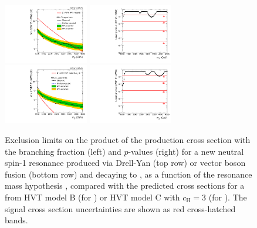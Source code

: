 \begin{figure}[htbp]
  \centering
  \includegraphics[width=0.33\textwidth]{fig/results/limits_ZprToWW.pdf}
  \includegraphics[width=0.33\textwidth]{fig/results/pvalue_ZprToWW.pdf}\\
  \includegraphics[width=0.33\textwidth]{fig/results/limits_VBFZprToWW.pdf}
  \includegraphics[width=0.33\textwidth]{fig/results/pvalue_VBFZprToWW.pdf}
  \caption{
    Exclusion limits on the product of the production cross section with the branching fraction (left) and $p$-values (right) for a new neutral spin-1 resonance produced via Drell-Yan (top row) or vector boson fusion (bottom row) and decaying to \WW, as a function of the resonance mass hypothesis \MX, compared with the predicted cross sections for a \Zpr from HVT model B (for \DY) or HVT model C with $c_\mathrm{H}=3$ (for \VBF).
    The signal cross section uncertainties are shown as red cross-hatched bands.
  }
  \label{fig:limits_pvalue_spin1_neut}
\end{figure}

